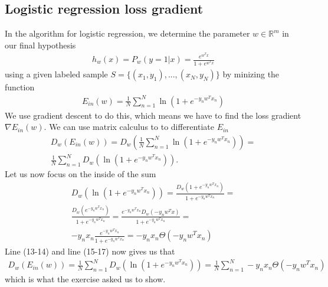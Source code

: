 \documentclass[12pt]{article}
\begin{document}
\subsection{Logistic regression loss gradient}

In the algorithm for logistic regression, we determine the parameter $w \in \mathbb{R}^m$ in our final hypothesis
\begin{align}
h_w(x) = P_w(y = 1|x) = \frac{e^{w^Tx}}{1 + e^{w^Tx}}
\end{align}
using a given labeled sample $S = \{(x_1,y_1),...,(x_N,y_N)\}$ by minizing the function
\begin{align}
E_{in}(w) = \frac{1}{N} \sum_{n=1}^N \ln(1 + e^{-y_n w^T x_n})
\end{align}
We use gradient descent to do this, which means we have to find the loss gradient $\nabla E_{in}(w)$. We can use matrix calculus to to differentiate $E_{in}$
\begin{align}
D_w (E_{in}(w)) = D_w\left( \frac{1}{N} \sum_{n=1}^N \ln(1 + e^{-y_n w^T x_n}) \right) = \\ 
 \frac{1}{N} \sum_{n=1}^N D_w \left( \ln(1 + e^{-y_n w^T x_n}) \right). 
\end{align}
Let us now focus on the inside of the sum
\begin{align}
D_w \left( \ln(1 + e^{-y_n w^T x_n}) \right) = \frac{D_w ( 1 + e^{-y_n w^T x_n})}{1 + e^{-y_n w^T x_n}} = \\ 
\frac{D_w (e^{-y_n w^T x_n})}{1 + e^{-y_n w^T x_n}} =
\frac{e^{-y_n w^T x_n} D_w(-y_nw^Tx)}{1 + e^{-y_n w^T x_n}} = \\ 
-y_n x_n \frac{e^{-y_n w^T x_n}}{1 + e^{-y_n w^T x_n}} = -y_n x_n \Theta(-y_n w^T x_n)
\end{align}
Line (13-14) and line (15-17) now gives us that
\begin{align}
D_w (E_{in}(w)) =  \frac{1}{N} \sum_{n=1}^N D_w \left( \ln(1 + e^{-y_n w^T x_n}) \right) =
\frac{1}{N} \sum_{n=1}^N  -y_n x_n \Theta(-y_n w^T x_n) 
\end{align}
which is what the exercise asked us to show. 
\end{document}
